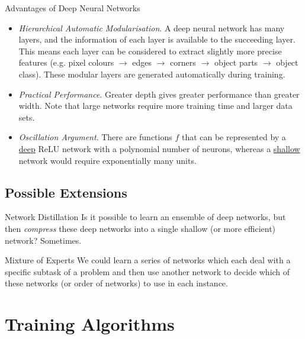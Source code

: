 \documentclass[11pt,a4paper]{article}
\begin{document}
  \begin{remark}{Advantages of Deep Neural Networks}
    \begin{itemize}
      \item \textit{Hierarchical Automatic Modularisation}. A deep neural network has many layers, and the information of each layer is available to the succeeding layer. This means each layer can be considered to extract slightly more precise features (e.g. pixel colours $\to$ edges $\to$ corners $\to$ object parts $\to$ object class). These modular layers are generated automatically during training.
      \item \textit{Practical Performance}. Greater depth gives greater performance than greater width. Note that large networks require more training time and larger data sets.
      \item \textit{Oscillation Argument}. There are functions $f$ that can be represented by a \underline{deep} ReLU network with a polynomial number of neurons, whereas a \underline{shallow} network would require exponentially many units.
    \end{itemize}
  \end{remark}

\subsection{Possible Extensions}

  \begin{proposition}{Network Distillation}
    Is it possible to learn an ensemble of deep networks, but then \textit{compress} these deep networks into a single shallow (or more efficient) network? Sometimes.
  \end{proposition}

  \begin{proposition}{Mixture of Experts}
    We could learn a series of networks which each deal with a specific subtask of a problem and then use another network to decide which of these networks (or order of networks) to use in each instance.
  \end{proposition}

\section{Training Algorithms}
\end{document}
